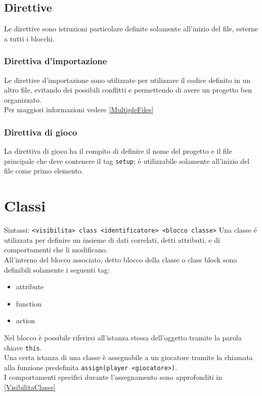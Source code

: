 \subsection{Direttive}
Le direttive sono istruzioni particolare definite solamente all'inizio del file, esterne a 
tutti i blocchi.

\subsubsection{Direttiva d'importazione}
Le direttive d'importazione sono utilizzate per utilizzare il codice definito in un altro
file, evitando dei possibili conflitti e permettendo di avere un progetto ben organizzato. \\
Per maggiori informazioni vedere \ref{MultipleFiles}

\subsubsection{Direttiva di gioco}
La direttiva di gioco ha il compito di definire il nome del progetto e il file principale
che deve contenere il tag \lstinline|setup|; é utilizzabile solamente all'inizio del file 
come primo elemento. \\


\section{Classi}
Sintassi: \lstinline|<visibilita> class <identificatore> <blocco classe>|
Una classe é utilizzata per definire un insieme di dati correlati, detti attributi, e di 
comportamenti che li modificano. \\
All'interno del blocco associato, detto blocco della classe o class block sono definibili
solamente i seguenti tag:
\begin{itemize}
    \item attribute
    \item function
    \item action
\end{itemize}
Nel blocco è possibile riferirsi all'istanza stessa dell'oggetto tramite la parola chiave \lstinline|this|. \\
Una certa istanza di una classe è assegnabile a un giocatore tramite la chiamata alla funzione predefinita \lstinline|assign(player <giocatore>)|. \\
I comportamenti specifici durante l'assegnamento sono approfonditi in \ref*{VisibilitaClasse}

